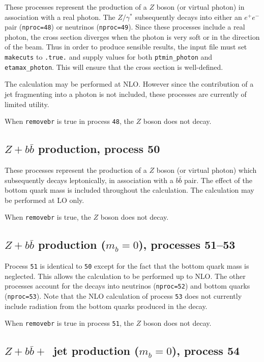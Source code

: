\documentclass[12pt]{article}
\begin{document}
These processes represent the production of a $Z$ boson (or virtual photon)
in association with a real photon. The $Z/\gamma^*$ subsequently decays into 
either an $e^+ e^-$ pair ({\tt nproc=48}) or neutrinos ({\tt nproc=49}).
Since these processes include a real photon, the cross section diverges
when the photon is very soft or in the direction of the beam.
Thus in order to produce sensible results, the input file must set
{\tt makecuts} to {\tt .true.} and supply values for both
{\tt ptmin\_photon} and {\tt etamax\_photon}. This will ensure that
the cross section is well-defined.

The calculation may be performed at NLO. However since the contribution
of a jet fragmenting into a photon is not included, 
these processes are currently of limited utility.


When {\tt removebr} is true in process {\tt 48}, the $Z$ boson does not decay.

\subsection{$Z+b{\bar b}$ production, process 50}
\label{subsec:zbb}

These processes represent the production of a $Z$ boson (or virtual photon)
which subsequently decays leptonically, in association
with a $b{\bar b}$ pair. The effect of
the bottom quark mass is included throughout the calculation.  
The calculation may be performed at LO only.

When {\tt removebr} is true, the $Z$ boson does not decay.

\subsection{$Z+b{\bar b}$ production ($m_b=0$), processes 51--53}
\label{subsec:zbbmassless}

Process {\tt 51} is identical to {\tt 50} except for the fact
that the bottom quark mass is neglected. This allows the calculation to be
performed up to NLO. The other processes account for the decays into
neutrinos ({\tt nproc=52}) and bottom quarks ({\tt nproc=53}). Note that
the NLO calculation of process {\tt 53} does not currently 
include radiation from the
bottom quarks produced in the decay.

When {\tt removebr} is true in process {\tt 51}, the $Z$ boson does not decay.

\subsection{$Z+b{\bar b}+$~jet production ($m_b=0$), process 54}
\label{subsec:zbbjetmassless}
\end{document}
